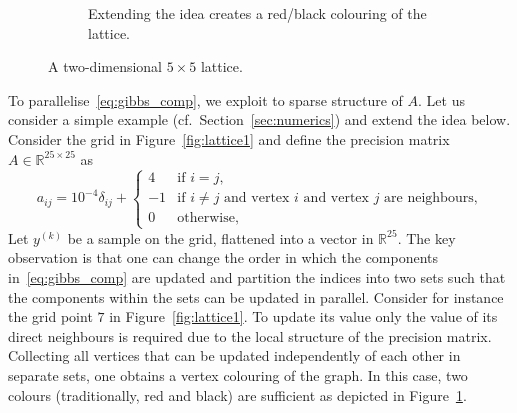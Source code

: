 \documentclass[
fontsize=11pt,
paper=a4,
numbers=noenddot
]{scrartcl}
\begin{document}
\begin{figure}[htpb]
\begin{subfigure}[t]{.48\linewidth}
        \caption{Extending the idea creates a red/black colouring of the lattice.}\label{fig:lattice2}
    \end{subfigure}
    \caption{A two-dimensional $5 \times 5$ lattice.}\label{fig:lattice}
\end{figure}

To parallelise~\eqref{eq:gibbs_comp}, we exploit to sparse structure of $A$. Let us consider a simple example (cf.~Section~\ref{sec:numerics}) and extend the idea below. Consider the grid in Figure~\ref{fig:lattice1} and define the precision matrix $A \in \mathbb{R}^{25 \times 25}$ as
\begin{equation*}
   a_{ij} = 
   10^{-4} \delta_{ij} + 
    \begin{cases}
        4 & \text{if $i = j$,} \\
        -1 &  \text{if $i \neq j$ and vertex $i$ and vertex $j$ are neighbours,} \\
        0 & \text{otherwise,}
    \end{cases}
\end{equation*} 
Let $y^{(k)}$ be a sample on the grid, flattened into a vector in $\mathbb{R}^{25}$. The key observation is that one can change the order in which the components in~\eqref{eq:gibbs_comp} are updated and partition the indices into two sets such that the components within the sets can be updated in parallel. Consider for instance the grid point $7$ in Figure~\ref{fig:lattice1}. To update its value only the value of its direct neighbours is required due to the local structure of the precision matrix. Collecting all vertices that can be updated independently of each other in separate sets, one obtains a vertex colouring of the graph. In this case, two colours (traditionally, red and black) are sufficient as depicted in Figure~\ref{fig:lattice2}. 
\end{document}
